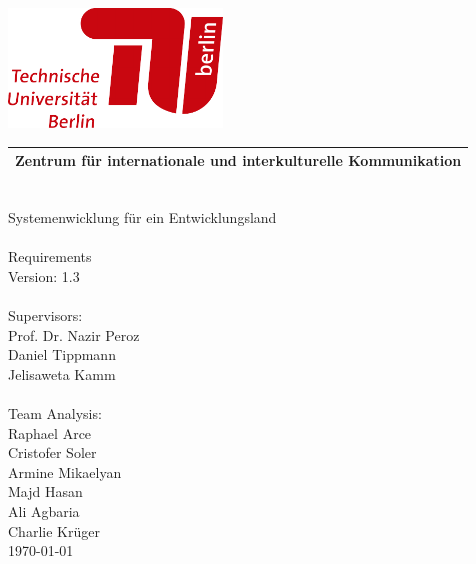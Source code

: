 \documentclass[12pt, a4paper, headinclude, footinclude, plainfootsepline]{scrreprt}
\begin{document}
\pagecolor{darkblue}

\hspace*{2cm}\includegraphics[width=57mm]{../Pictures/TULogo}

\begin{tabularx}{\textwidth}{C}
\\
\hline
\color{skyblue} Zentrum für internationale und interkulturelle Kommunikation\\
\hline
\end{tabularx}
\vspace*{5cm}\\
\hspace*{3cm}\color{skyblue}\Huge Systemenwicklung für ein Entwicklungsland 
\\
\vspace*{0,7cm}\\
\hspace*{3cm}\Large Requirements\\
\hspace*{3cm}\small Version: 1.3
\\
\vspace*{4cm}\\
\hspace*{3cm}\Large Supervisors:
\\
{\normalsize
	\hspace*{3.5cm}Prof. Dr. Nazir Peroz\\
	\hspace*{3.5cm}Daniel Tippmann\\
	\hspace*{3.5cm}Jelisaweta Kamm\\
}
\vspace*{0.5cm}\\
\hspace*{3cm}\Large Team Analysis:\\
{\normalsize
	\hspace*{3.5cm}Raphael Arce\\
	\hspace*{3.5cm}Cristofer Soler\\
	\hspace*{3.5cm}Armine Mikaelyan\\
	\hspace*{3.5cm}Majd Hasan\\
	\hspace*{3.5cm}Ali Agbaria\\
	\hspace*{3.5cm}Charlie Krüger\\
}
\hspace*{14cm}\large \today
\end{document}
